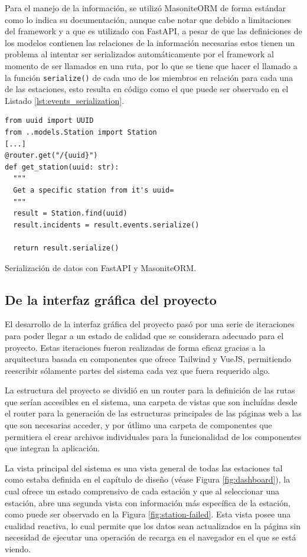 Para el manejo de la información, se utilizó MasoniteORM de forma estándar como lo indica su documentación, aunque cabe notar que debido a limitaciones del framework y a que es utilizado con FastAPI, a pesar de que las definiciones de los modelos contienen las relaciones de la información necesarias estos tienen un problema al intentar ser serializados automáticamente por el framework al momento de ser llamados en una ruta, por lo que se tiene que hacer el llamado a la función \texttt{serialize()} de cada uno de los miembros en relación para cada una de las estaciones, esto resulta en código como el que puede ser observado en el Listado \ref{lst:events_serialization}.

\begin{listing}
\begin{verbatim}
from uuid import UUID
from ..models.Station import Station
[...]
@router.get("/{uuid}")
def get_station(uuid: str):
  """
  Get a specific station from it's uuid=
  """
  result = Station.find(uuid)
  result.incidents = result.events.serialize()

  return result.serialize()
\end{verbatim}
\caption{Serialización de datos con FastAPI y MasoniteORM.}
\label{lst:events_serialization}
\end{listing}

\subsection{De la interfaz gráfica del proyecto}

El desarrollo de la interfaz gráfica del proyecto pasó por una serie de iteraciones para poder llegar a un estado de calidad que se considerara adecuado para el proyecto. Estas iteraciones fueron realizadas de forma eficaz gracias a la arquitectura basada en componentes que ofrece Tailwind y VueJS, permitiendo reescribir sólamente partes del sistema cada vez que fuera requerido algo.

La estructura del proyecto se dividió en un router para la definición de las rutas que serían accesibles en el sistema, una carpeta de vistas que son incluídas desde el router para la generación de las estructuras principales de las páginas web a las que son necesarias acceder, y por útlimo una carpeta de componentes que permitiera el crear archivos individuales para la funcionalidad de los componentes que integran la aplicación.

La vista principal del sistema es una vista general de todas las estaciones tal como estaba definida en el capítulo de diseño (véase Figura \ref{fig:dashboard}), la cual ofrece un estado comprensivo de cada estación y que al seleccionar una estación, abre una segunda vista con información más específica de la estación, como puede ser observado en la Figura \ref{fig:station-failed}. Esta vista posee una cualidad reactiva, lo cual permite que los datos sean actualizados en la página sin necesidad de ejecutar una operación de recarga en el navegador en el que se está viendo.

